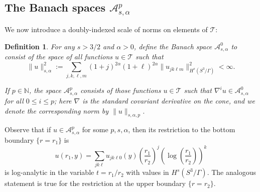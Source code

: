 \documentclass[12pt]{article}
\newtheorem{defn}[thm]{Definition}
\newcommand{\NN}{\mathbb N}
\newcommand{\calA}{{\mathcal A}}
\newcommand{\calT}{{\mathcal T}}
\begin{document}


\subsection{The Banach spaces $\calA^p_{s,\alpha}$}
We now introduce a doubly-indexed scale of norms on elements of $\calT$: 
\begin{defn}
For any $s > 3/2$ and $\alpha > 0$, define the Banach space $\calA_{s,\alpha}^0$ to consist of 
the space of all functions $u \in \calT$ such that
\[
\|u\|_{s,\alpha}^2:= \sum_{j, k, \ell, m} (1+j)^{2\alpha}(1+\ell)^{2\alpha} \|u_{j k \ell m}\|_{H^s(S^3/\Gamma)}^2 < \infty. 
\]

If $p \in \NN$, the space $\calA^p_{s,\alpha}$ consists of those functions $u \in \calT$ such that 
$\nabla^i u \in \calA^0_{s,\alpha}$ for all $0 \leq i \leq p$; here $\nabla$ is the standard covariant derivative 
on the cone, and we denote the corresponding norm by $\|u\|_{s,\alpha,p}$. 
\label{norms}
\end{defn}

Observe that if $u \in \calA^p_{s,\alpha}$ for some $p, s, \alpha$, then its restriction to the bottom boundary $\{r =r_1\}$ is
\[
u(r_1,y)=\sum_{j k \ell} u_{j k \ell 0}(y) \left(\frac{r_1}{r_2} \right)^j \left( \log \left(\frac{r_1}{r_2} \right) \right)^k
\]
is log-analytic in the variable $t = r_1/r_2$ with values in  $H^s(S^3/\Gamma)$.  The analogous statement is true for
the restriction at the upper boundary $\{r = r_2\}$. 
\end{document}

